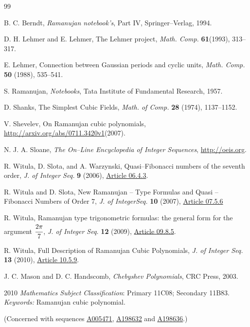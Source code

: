 \documentclass[12pt,reqno]{article}
\newcommand{\seqnum}[1]{\href{http://www.research.att.com/cgi-bin/access.cgi/as/~njas/sequences/eisA.cgi?Anum=#1}{\underline{#1}}}
\begin{document}
\begin{thebibliography}{99}

 B. C. Berndt, \emph{Ramanujan notebook's}, Part IV, Springer--Verlag, 1994.

 D. H. Lehmer and E. Lehmer, The Lehmer project, \emph{Math. Comp.} \textbf{61}(1993), 313--317.

 E. Lehmer, Connection between Gaussian periods and cyclic units, \emph{Math. Comp.} \textbf{50} (1988), 535--541. 

 S. Ramanujan, \emph{Notebooks}, Tata Institute of Fundamental Research, 1957.

 D. Shanks, The Simplest Cubic Fields, \emph{Math. of Comp.} \textbf{28} (1974), 1137--1152.

 V. Shevelev, On Ramanujan cubic polynomials, \url{http://arxiv.org/abs/0711.3420v1}(2007).

 N. J. A. Sloane, \emph{The On--Line Encyclopedia of Integer Sequences}, \url{http://oeis.org}.

 R. Witula, D. Slota, and A. Warzynski, Quasi--Fibonacci numbers of the seventh order, \emph{J. of Integer Seq.} \textbf{9} (2006),
\href{https://cs.uwaterloo.ca/journals/JIS/VOL9/Slota/slota57.html}{Article 06.4.3}.

 R. Witula and D. Slota, New Ramanujan -- Type Formulas and Quasi -- Fibonacci Numbers of Order 7, \emph{J. of IntegerSeq.} \textbf{10} (2007),
\href{https://cs.uwaterloo.ca/journals/JIS/VOL10/Slota/witula13.html}{Article 07.5.6}

 R. Witula, Ramanujan type trigonometric formulas: the general form for the argument $\cfrac{2\pi}{7}$, \emph{J. of Integer Seq.} \textbf{12} (2009),
\href{https://cs.uwaterloo.ca/journals/JIS/VOL12/Witula/witula17.html}{Article 09.8.5}.

 R. Witula, Full Description of Ramanujan Cubic Polynomials, \emph{J. of Integer Seq.} \textbf{13} (2010),
\href{https://cs.uwaterloo.ca/journals/JIS/VOL13/Witula/witula30.pdf}{Article 10.5.9}.

 J. C. Mason and D. C. Handscomb, \emph{Chebyshev Polynomials}, CRC Press, 2003.
\end{thebibliography}


2010 {\it Mathematics Subject Classification}:
Primary 11C08; Secondary 11B83.
 \emph{Keywords:} 
Ramanujan cubic polynomial.



(Concerned with sequences \seqnum{A005471}, \seqnum{A198632} and \seqnum{A198636}.)
\end{document}
